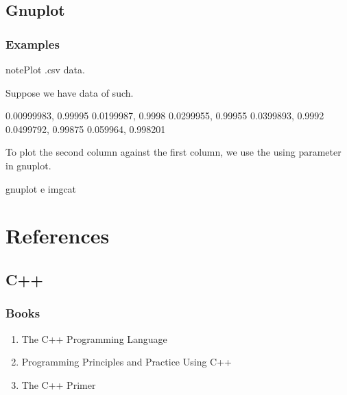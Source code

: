 \documentclass[letterpaper,12pt,english]{sphinxmanual}
\begin{document}
\section{Gnuplot}
\label{\detokenize{tools/gnuplot::doc}}\label{\detokenize{tools/gnuplot:gnuplot}}

\subsection{Examples}
\label{\detokenize{tools/gnuplot:examples}}
\begin{sphinxadmonition}{note}{Plot .csv data.}

Suppose we have data of such.

\begin{sphinxVerbatim}[commandchars=\\\{\}]
\PYGZhy{}0.00999983, 0.99995
\PYGZhy{}0.0199987, 0.9998
\PYGZhy{}0.0299955, 0.99955
\PYGZhy{}0.0399893, 0.9992
\PYGZhy{}0.0499792, 0.99875
\PYGZhy{}0.059964, 0.998201
\end{sphinxVerbatim}

To plot the second column against the first column, we use the using parameter in gnuplot.

\begin{sphinxVerbatim}[commandchars=\\\{\}]
gnuplot \PYGZhy{}e   imgcat

\end{sphinxVerbatim}
\end{sphinxadmonition}


\chapter{References}
\label{\detokenize{references/index::doc}}\label{\detokenize{references/index:references}}

\section{C++}
\label{\detokenize{references/index:c}}

\subsection{Books}
\label{\detokenize{references/index:books}}\begin{enumerate}
\item {} 
The C++ Programming Language

\item {} 
Programming Principles and Practice Using C++

\item {} 
The C++ Primer

\end{enumerate}
\end{document}
